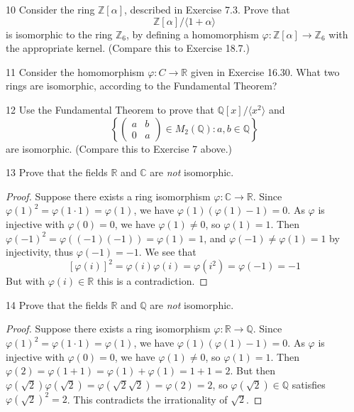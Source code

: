 \begin{problem}{10}
    Consider the ring $\mathbb{Z}[\alpha]$, described in Exercise 7.3. Prove that
    \[\mathbb{Z}[\alpha]/\langle 1 + \alpha \rangle\]
    is isomorphic to the ring $\mathbb{Z}_6$, by defining a homomorphism
    $\varphi : \mathbb{Z}[\alpha] \to \mathbb{Z}_6$ with the appropriate kernel. (Compare
    this to Exercise 18.7.)
\end{problem}
\unsolved

\begin{problem}{11}
    Consider the homomorphism $\varphi : C \to \mathbb{R}$ given in Exercise 16.30. What
    two rings are isomorphic, according to the Fundamental Theorem?
\end{problem}
\unsolved

\begin{problem}{12}
    Use the Fundamental Theorem to prove that $\mathbb{Q}[x]/\langle x^2 \rangle$ and
    \[\left\{\begin{pmatrix} a & b \\ 0 & a \end{pmatrix} \in M_2(\mathbb{Q}) : a, b \in \mathbb{Q}\right\}\]
    are isomorphic. (Compare this to Exercise 7 above.)
\end{problem}
\unsolved

\begin{problem}{13}
Prove that the fields $\mathbb{R}$ and $\mathbb{C}$ are \textit{not} isomorphic. 
\end{problem}
\solved

\begin{proof}
    Suppose there exists a ring isomorphism  $\varphi : \mathbb{C} \to \mathbb{R}$.
    Since $\varphi(1)^2 = \varphi(1 \cdot 1) = \varphi(1)$, we have $\varphi(1)(\varphi(1) - 1) = 0$.
    As $\varphi$ is injective with $\varphi(0) = 0$, we have $\varphi(1) \ne 0$, so $\varphi(1) = 1$.
    Then $\varphi(-1)^2 = \varphi((-1)(-1)) = \varphi(1) = 1$, and $\varphi(-1) \ne \varphi(1) = 1$
        by injectivity, thus $\varphi(-1) = -1$.
    We see that 
    \[[\varphi(i)]^2 = \varphi(i)\varphi(i) = \varphi(i^2) = \varphi(-1) = -1\]
    But with $\varphi(i) \in \mathbb{R}$ this is a contradiction.
\end{proof}

\begin{problem}{14}
Prove that the fields $\mathbb{R}$ and $\mathbb{Q}$ are \textit{not} isomorphic. 
\end{problem}
\solved

\begin{proof}
    Suppose there exists a ring isomorphism  $\varphi : \mathbb{R} \to \mathbb{Q}$.
    Since $\varphi(1)^2 = \varphi(1 \cdot 1) = \varphi(1)$, we have $\varphi(1)(\varphi(1) - 1) = 0$.
    As $\varphi$ is injective with $\varphi(0) = 0$, we have $\varphi(1) \ne 0$, so $\varphi(1) = 1$.
    Then $\varphi(2) = \varphi(1 + 1) = \varphi(1) + \varphi(1) = 1 + 1 = 2$.
    But then $\varphi(\sqrt{2})\varphi(\sqrt{2}) = \varphi(\sqrt{2}\sqrt{2}) = \varphi(2) = 2$,
        so $\varphi(\sqrt{2}) \in \mathbb{Q}$ satisfies $\varphi(\sqrt{2})^2 = 2$.
    This contradicts the irrationality of $\sqrt{2}$.
\end{proof}

